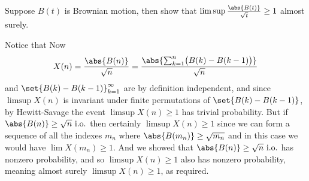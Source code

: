 \bexerc

    Suppose $B(t)$ is Brownian motion, then show that $\limsup\frac{\abs{B(t)}}{\sqrt t}\geq1$ almost surely.

\eexerc

Notice that
Now
$$ X(n) = \frac{\abs{B(n)}}{\sqrt n}=\frac{\abs{\sum_{k=1}^n\bigl(B(k)-B(k-1)\bigr)}}{\sqrt n} $$
and $\set{B(k)-B(k-1)}_{k=1}^\infty$ are by definition independent, and since $\limsup X(n)$ is invariant under finite permutations of $\set{B(k)-B(k-1)}$, by Hewitt-Savage the event $\limsup X(n)\geq1$
has trivial probability.
But if $\abs{B(n)}\geq\sqrt n\hbox{ i.o.}$ then certainly $\limsup X(n)\geq1$ since we can form a sequence of all the indexes $m_n$ where $\abs{B(m_n)}\geq\sqrt{m_n}$ and in this case we would have
$\lim X(m_n)\geq1$.
And we showed that $\abs{B(n)}\geq\sqrt n\hbox{ i.o.}$ has nonzero probability, and so $\limsup X(n)\geq1$ also has nonzero probability, meaning almost surely $\limsup X(n)\geq1$, as required.

\bye

